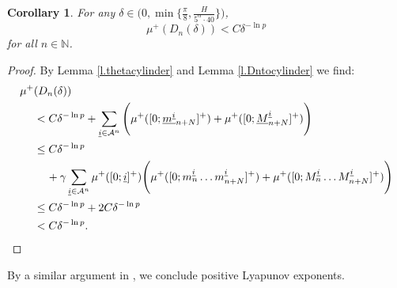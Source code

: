 \documentclass{amsart}
\newtheorem{corollary}{Corollary}
\newcommand{\NN}{\mathbb{N}}
\newcommand{\A}{\mathcal{A}}
\begin{document}
\begin{corollary}\label{c.measureDN}
    For any $\delta\in \Big(0, \min\{\frac{\pi}{8}, \frac{H}{5^\alpha \cdot 40}\}\Big)$,
    \[\mu^+(D_n(\delta)) < C\delta^{-\ln p}\]
    for all $n\in \NN$.
\end{corollary}
\begin{proof}
    By Lemma \ref{l.thetacylinder} and Lemma \ref{l.Dntocylinder} we find:
    \begin{align*}
        \mu^+&(D_n(\delta)) \\
        &< C\delta^{-\ln p} + \sum_{\underline{i}\in \A^n} \Bigg(\mu^+([0;\underline{m^{\underline{i}}}_{n+N}]^+) + \mu^+([0;\underline{M}^{\underline{i}}_{n+N}]^+)\Bigg)\\
        &\leq C\delta^{-\ln p} \\
        &\hspace{4mm}+ \gamma\sum_{\underline{i}\in \A^n} \mu^+([0;\underline{i}]^+)\Bigg(\mu^+([0;m^{\underline{i}}_n\dots m^{\underline{i}}_{n+N}]^+) + \mu^+([0;M^{\underline{i}}_n\dots M^{\underline{i}}_{n+N}]^+)\Bigg)\\
        &\leq C\delta^{-\ln p} + 2C\delta^{-\ln p}\\
        &< C\delta^{-\ln p}.
    \end{align*}
\end{proof}

By a similar argument in \cite{young}, we conclude positive Lyapunov exponents.
\end{document}
